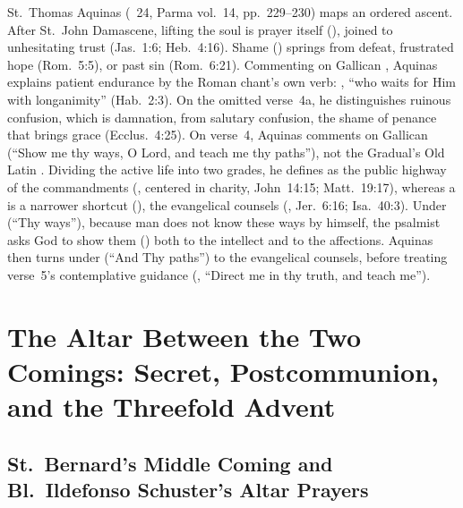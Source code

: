 St.~Thomas Aquinas (~24, Parma vol.~14, pp.~229--230) maps an ordered ascent. After St.~John Damascene, lifting the soul is prayer itself (), joined to unhesitating trust (Jas.~1:6; Heb.~4:16). Shame () springs from defeat, frustrated hope (Rom.~5:5), or past sin (Rom.~6:21). Commenting on Gallican , Aquinas explains patient endurance by the Roman chant's own verb: , ``who waits for Him with longanimity'' (Hab.~2:3). On the omitted verse~4a, he distinguishes ruinous confusion, which is damnation, from salutary confusion, the shame of penance that brings grace (Ecclus.~4:25). On verse~4, Aquinas comments on Gallican  (``Show me thy ways, O Lord, and teach me thy paths''), not the Gradual's Old Latin . Dividing the active life into two grades, he defines  as the public highway of the commandments (, centered in charity, John~14:15; Matt.~19:17), whereas a  is a narrower shortcut (), the evangelical counsels (, Jer.~6:16; Isa.~40:3). Under  (``Thy ways''), because man does not know these ways by himself, the psalmist asks God to show them () both to the intellect and to the affections. Aquinas then turns under  (``And Thy paths'') to the evangelical counsels, before treating verse~5's contemplative guidance (, ``Direct me in thy truth, and teach me'').

\section{The Altar Between the Two Comings: Secret, Postcommunion, and the Threefold Advent}

\subsection{St.~Bernard's Middle Coming and Bl.~Ildefonso Schuster's Altar Prayers}

